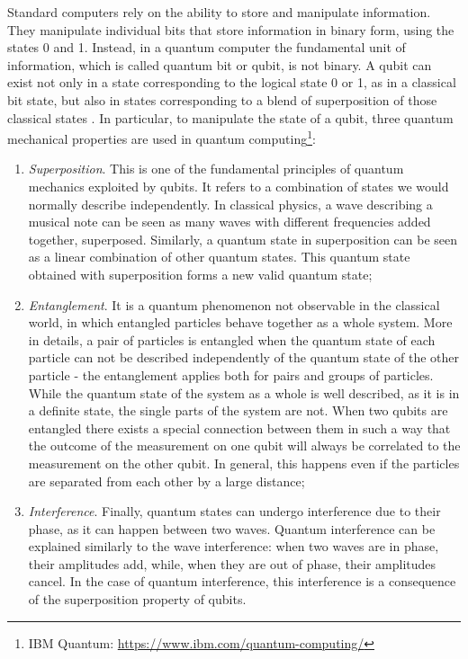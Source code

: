 \documentclass[a4paper,12pt]{article}
\begin{document}
Standard computers rely on the ability to store and manipulate information. They manipulate individual bits that store information in binary form, using the states 0 and 1.
Instead, in a quantum computer the fundamental unit of information, which is called quantum bit or qubit, is not binary. A qubit can exist not only in a state corresponding to the logical state 0 or 1, as in a classical bit state, but also in states corresponding to a blend of superposition of those classical states \cite{16_Quantum}.
In particular, to manipulate the state of a qubit, three quantum mechanical properties are used in quantum computing\footnote{IBM Quantum: \url{https://www.ibm.com/quantum-computing/}}:
\begin{enumerate}
	\item \textit{Superposition}. This is one of the fundamental principles of quantum mechanics exploited by qubits. It refers to a combination of states we would normally describe independently. In classical physics, a wave describing a musical note can be seen as many waves with different frequencies added together, superposed. Similarly, a quantum state in superposition can be seen as a linear combination of other quantum states. This quantum state obtained with superposition forms a new valid quantum state;
	\item \textit{Entanglement}. It is a quantum phenomenon not observable in the classical world, in which entangled particles behave together as a whole system. More in details, a pair of particles is entangled when the quantum state of each particle can not be described independently of the quantum state of the other particle - the entanglement applies both for pairs and groups of particles. While the quantum state of the system as a whole is well described, as it is in a definite state, the single parts of the system are not. When two qubits are entangled there exists a special connection between them in such a way that the outcome of the measurement on one qubit will always be correlated to the measurement on the other qubit. In general, this happens even if the particles are separated from each other by a large distance;
	\item \textit{Interference}. Finally, quantum states can undergo interference due to their phase, as it can happen between two waves. Quantum interference can be explained similarly to the wave interference: when two waves are in phase, their amplitudes add, while, when they are out of phase, their amplitudes cancel. In the case of quantum interference, this interference is a consequence of the superposition property of qubits.
\end{enumerate}
\end{document}
